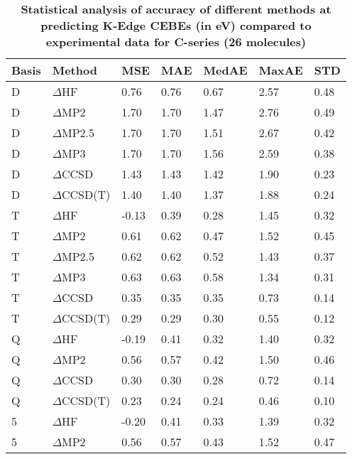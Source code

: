 \begin{table}
  \caption{\textbf{Statistical analysis of accuracy of different methods at predicting K-Edge CEBEs (in eV) compared to experimental data for C-series (26 molecules)}}
  \label{tbl:method-summary-c}
  \begin{tabular}{l l l l l l l }
    \hline
    \textbf{Basis} & \textbf{Method} & \textbf{MSE} & \textbf{MAE} & \textbf{MedAE} & \textbf{MaxAE} & \textbf{STD} \\ 
    \hline
    D & $\Delta$HF & 0.76 & 0.76 & 0.67 & 2.57 & 0.48 \\ 
    D & $\Delta$MP2 & 1.70 & 1.70 & 1.47 & 2.76 & 0.49 \\ 
    D & $\Delta$MP2.5 & 1.70 & 1.70 & 1.51 & 2.67 & 0.42 \\ 
    D & $\Delta$MP3 & 1.70 & 1.70 & 1.56 & 2.59 & 0.38 \\ 
    D & $\Delta$CCSD & 1.43 & 1.43 & 1.42 & 1.90 & 0.23 \\ 
    D & $\Delta$CCSD(T) & 1.40 & 1.40 & 1.37 & 1.88 & 0.24 \\ 
    T & $\Delta$HF & -0.13 & 0.39 & 0.28 & 1.45 & 0.32 \\ 
    T & $\Delta$MP2 & 0.61 & 0.62 & 0.47 & 1.52 & 0.45 \\ 
    T & $\Delta$MP2.5 & 0.62 & 0.62 & 0.52 & 1.43 & 0.37 \\ 
    T & $\Delta$MP3 & 0.63 & 0.63 & 0.58 & 1.34 & 0.31 \\ 
    T & $\Delta$CCSD & 0.35 & 0.35 & 0.35 & 0.73 & 0.14 \\ 
    T & $\Delta$CCSD(T) & 0.29 & 0.29 & 0.30 & 0.55 & 0.12 \\ 
    Q & $\Delta$HF & -0.19 & 0.41 & 0.32 & 1.40 & 0.32 \\ 
    Q & $\Delta$MP2 & 0.56 & 0.57 & 0.42 & 1.50 & 0.46 \\ 
    Q & $\Delta$CCSD & 0.30 & 0.30 & 0.28 & 0.72 & 0.14 \\ 
    Q & $\Delta$CCSD(T) & 0.23 & 0.24 & 0.24 & 0.46 & 0.10 \\ 
    5 & $\Delta$HF & -0.20 & 0.41 & 0.33 & 1.39 & 0.32 \\ 
    5 & $\Delta$MP2 & 0.56 & 0.57 & 0.43 & 1.52 & 0.47 \\ 
    \hline
  \end{tabular}
\end{table}
